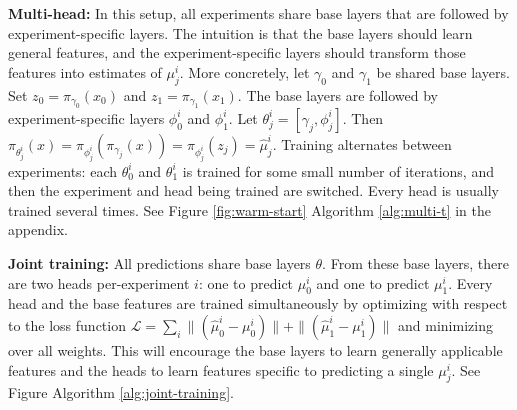\textbf{Multi-head:} In this setup, all experiments share base layers that are followed by experiment-specific layers. The intuition is that the base layers should learn general features, and the experiment-specific layers should transform those features into estimates of $\mu_j^i$. More concretely, let $\gamma_0$ and $\gamma_1$ be shared base layers. Set $z_0 = \pi_{\gamma_0}(x_0)$ and $z_1 = \pi_{\gamma_1}(x_1)$. The base layers are followed by experiment-specific layers $\phi_0^i$ and $\phi_1^i$. Let $\theta_j^i = \left[\gamma_j, \phi_j^i \right]$. Then $\pi_{\theta_j^i}(x) = \pi_{\phi_j^i} \left(\pi_{\gamma_j}(x) \right) = \pi_{\phi_j^i} (z_j) = \hat{\mu}_j^i$. Training alternates between experiments: each $\theta_0^i$ and $\theta_1^i$ is trained for some small number of iterations, and then the experiment and head being trained are switched. Every head is usually trained several times. See Figure \ref{fig:warm-start} Algorithm \ref{alg:multi-t} in the appendix.



\textbf{Joint training:} All predictions share base layers $\theta$. From these base layers, there are two heads per-experiment $i$: one to predict $\mu_0^i$ and one to predict $\mu_1^i$. Every head and the base features are trained simultaneously by optimizing with respect to the loss function $\mathcal{L} = \sum_i  \| \left(\hat{\mu}_0^i - \mu_0^i \right) \| + \| \left(\hat{\mu}_1^i - \mu_1^i \right) \|$ and minimizing over all weights. This will encourage the base layers to learn generally applicable features and the heads to learn features specific to predicting a single $\mu_j^i$. See Figure Algorithm \ref{alg:joint-training}. 



